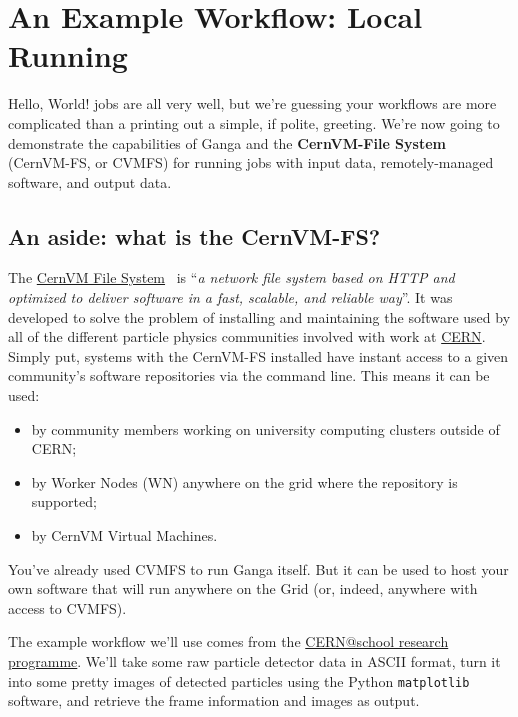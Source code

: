 \section{An Example Workflow: Local Running}
\label{sec:localrunning}
Hello, World! jobs are all very well, but we're guessing your workflows
are more complicated than a printing out a simple, if polite, greeting.
We're now going to demonstrate the capabilities of Ganga and the
\textbf{CernVM-File System} (CernVM-FS, or CVMFS) for running jobs with
input data, remotely-managed software, and output data.

\subsection{An aside: what is the CernVM-FS?}
\label{an-aside-what-is-the-cernvm-fs}
The \href{http://cernvm.cern.ch/portal/startcvmfs}{CernVM File System}~\cite{CVMFS2015}
is ``\emph{a network file system based on HTTP and optimized to deliver
software in a fast, scalable, and reliable way}''. It was developed to
solve the problem of installing and maintaining the software used by all
of the different particle physics communities involved with work at
\href{https://cern.ch}{CERN}. Simply put, systems with the CernVM-FS
installed have instant access to a given community's software
repositories via the command line. This means it can be used:

\begin{itemize}
\tightlist
\item
  by community members working on university computing clusters outside
  of CERN;
\item
  by Worker Nodes (WN) anywhere on the grid where the repository is
  supported;
\item
  by CernVM Virtual Machines.
\end{itemize}

You've already used CVMFS to run Ganga itself. But it can be used to
host your own software that will run anywhere on the Grid (or, indeed,
anywhere with access to CVMFS).

The example workflow we'll use comes from the
\href{http://researchinschools.org/CERN/}{CERN@school research
programme}. We'll take some raw particle detector data in ASCII format,
turn it into some pretty images of detected particles using the Python
\texttt{matplotlib} software, and retrieve the frame information and
images as output.

